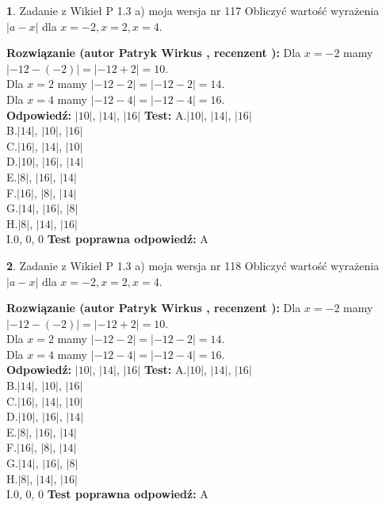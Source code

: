 \documentclass[12pt, a4paper]{article}
\theoremstyle{definition} %
\newtheorem{zad}{}
\newcommand{\zadStart}[1]{\begin{zad}#1\newline}
\newcommand{\zadStop}{\end{zad}}
\newcommand{\rozwStart}[2]{\noindent \textbf{Rozwiązanie (autor #1 , recenzent #2): }\newline}
\newcommand{\rozwStop}{\newline}
\newcommand{\odpStart}{\noindent \textbf{Odpowiedź:}\newline}
\newcommand{\odpStop}{\newline}
\newcommand{\testStart}{\noindent \textbf{Test:}\newline}
\newcommand{\testStop}{\newline}
\newcommand{\kluczStart}{\noindent \textbf{Test poprawna odpowiedź:}\newline}
\newcommand{\kluczStop}{\newline}
\begin{document}
\zadStart{Zadanie z Wikieł P 1.3 a) moja wersja nr 117}
Obliczyć wartość wyrażenia $|a - x|$ dla $x=-2,x=2,x=4$.
\zadStop
\rozwStart{Patryk Wirkus}{}
Dla $x = -2$ mamy $|-12 - (-2)| = |-12 + 2| = 10$.\\
Dla $x = 2$ mamy $|-12 - 2| = |-12 - 2| = 14$.\\
Dla $x = 4$ mamy $|-12 - 4| = |-12 - 4| = 16$.\\
\rozwStop
\odpStart
$|10|$, $|14|$, $|16|$
\odpStop
\testStart
A.$|10|$, $|14|$, $|16|$\\
B.$|14|$, $|10|$, $|16|$\\
C.$|16|$, $|14|$, $|10|$\\
D.$|10|$, $|16|$, $|14|$\\
E.$|8|$, $|16|$, $|14|$\\
F.$|16|$, $|8|$, $|14|$\\
G.$|14|$, $|16|$, $|8|$\\
H.$|8|$, $|14|$, $|16|$\\
I.$0$, $0$, $0$
\testStop
\kluczStart
A
\kluczStop



\zadStart{Zadanie z Wikieł P 1.3 a) moja wersja nr 118}
Obliczyć wartość wyrażenia $|a - x|$ dla $x=-2,x=2,x=4$.
\zadStop
\rozwStart{Patryk Wirkus}{}
Dla $x = -2$ mamy $|-12 - (-2)| = |-12 + 2| = 10$.\\
Dla $x = 2$ mamy $|-12 - 2| = |-12 - 2| = 14$.\\
Dla $x = 4$ mamy $|-12 - 4| = |-12 - 4| = 16$.\\
\rozwStop
\odpStart
$|10|$, $|14|$, $|16|$
\odpStop
\testStart
A.$|10|$, $|14|$, $|16|$\\
B.$|14|$, $|10|$, $|16|$\\
C.$|16|$, $|14|$, $|10|$\\
D.$|10|$, $|16|$, $|14|$\\
E.$|8|$, $|16|$, $|14|$\\
F.$|16|$, $|8|$, $|14|$\\
G.$|14|$, $|16|$, $|8|$\\
H.$|8|$, $|14|$, $|16|$\\
I.$0$, $0$, $0$
\testStop
\kluczStart
A
\kluczStop
\end{document}
